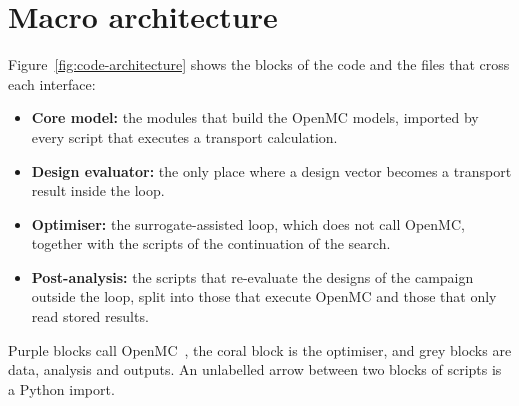 \section{Macro architecture}\label{sec:arch-macro}

Figure~\ref{fig:code-architecture} shows the blocks of the code and the
files that cross each interface:

\begin{itemize}[nosep]
  \item \textbf{Core model:} the modules that build the OpenMC
        models, imported by every script that executes a transport
        calculation.
  \item \textbf{Design evaluator:} the only place where a design
        vector becomes a transport result inside the loop.
  \item \textbf{Optimiser:} the surrogate-assisted loop, which does
        not call OpenMC, together with the scripts of the
        continuation of the search.
  \item \textbf{Post-analysis:} the scripts that re-evaluate the
        designs of the campaign outside the loop, split into those that
        execute OpenMC and those that only read stored results.
\end{itemize}

Purple blocks call OpenMC~\cite{romano_openmc_2015,romano_2021_depletion},
the coral block is the optimiser, and grey blocks are data, analysis
and outputs. An unlabelled arrow between two blocks of scripts is a
Python import.

